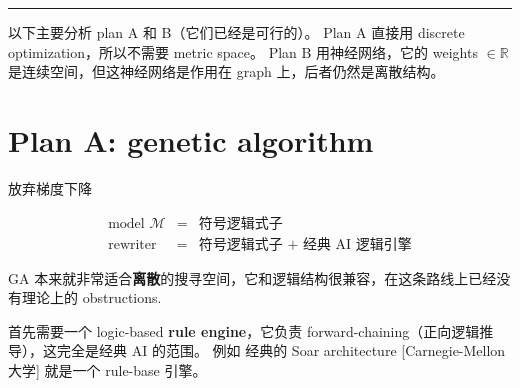 \documentclass[12pt, orivec]{article}
\begin{document}


\begin{center}
\rule{0.4\textwidth}{.6pt}
\end{center}

以下主要分析 plan A 和 B（它们已经是可行的）。 Plan A 直接用 discrete optimization，所以不需要 metric space。  Plan B 用神经网络，它的 weights $\in \mathbb{R}$ 是连续空间，但这神经网络是作用在 graph 上，后者仍然是离散结构。

\section{Plan A: genetic algorithm}
\label{COCO}

\begin{tcolorbox}[ams equation, colback=yellow, colframe=white]
\mbox{放弃梯度下降}
\end{tcolorbox}
\begin{eqnarray}
\mbox{model } \mathcal{M} &=& \mbox{符号逻辑式子} \nonumber \\
\mbox{rewriter} &=& \mbox{符号逻辑式子 + 经典 AI 逻辑引擎}
\end{eqnarray}

GA 本来就非常适合\textbf{离散}的搜寻空间，它和逻辑结构很兼容，在这条路线上已经没有理论上的 obstructions. 



首先需要一个 logic-based \textbf{rule engine}，它负责 forward-chaining（正向逻辑推导），这完全是经典 AI 的范围。 例如 经典的 Soar architecture [Carnegie-Mellon 大学] 就是一个 rule-base 引擎。 %
\end{document}
